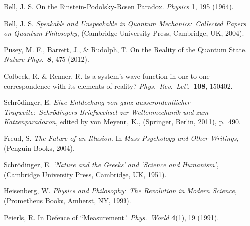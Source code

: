 \documentclass[aps,prb,superscriptaddress,12pt,tightenlines,nofootinbib]{revtex4-2}
\begin{document}
\begin{thebibliography}{99}

Bell, J. S. On the Einstein-Podolsky-Rosen Paradox. {\sl Physics\/} {\bf 1}, 195 (1964).

Bell, J. S. {\sl Speakable and Unspeakable in Quantum Mechanics:\ Collected Papers on Quantum Philosophy}, (Cambridge University Press, Cambridge, UK, 2004).

Pusey, M. F., Barrett, J., \& Rudolph, T. On the Reality of the Quantum State. {\sl Nature Phys.}\ {\bf 8}, 475 (2012).

Colbeck, R. \& Renner, R. Is a system's wave function in one-to-one correspondence with its elements of reality? {\sl Phys.\ Rev.\ Lett.}\ {\bf 108}, 150402.

Schr\"odinger, E. {\sl Eine Entdeckung von ganz ausserordentlicher Tragweite:\ Schr\"odingers Brief\-wechsel zur Wellenmechanik und zum Katzenparadoxon,} edited by von Meyenn, K., (Springer, Berlin, 2011), p.\ 490.


Freud, S. {\sl The Future of an Illusion}.   In {\sl Mass Psychology and Other Writings}, (Penguin Books, 2004).

Schr\"odinger, E. {\sl `Nature and the Greeks' and `Science and Humanism'}, (Cambridge University Press, Cambridge, UK, 1951).


Heisenberg, W. {\sl Physics and Philosophy:\ The Revolution in Modern Science}, (Prometheus Books, Amherst, NY, 1999).

Peierls, R. In Defence of ``Measurement''. {\sl Phys.\ World\/} {\bf 4}(1), 19 (1991).

\end{thebibliography}
\end{document}
